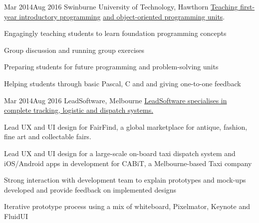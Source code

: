 {    
        {Mar 2014}{Aug 2016}
        {Swinburne University of Technology, Hawthorn}
        {\href{http://www.swinburne.edu.au/study/courses/units/Introduction-to-Programming-COS10009/local}{Teaching first-year introductory programming} \href{http://www.swinburne.edu.au/study/courses/units/Object-Oriented-Programming-COS70006/local}{and object-oriented programming units}.}
        {
          \item Engagingly teaching students to learn foundation programming concepts
          \item Group discussion and running group exercises
          \item Preparing students for future programming and problem-solving units
          \item Helping students through basic Pascal, C and \Csh\hspace{0.25ex}and giving one-to-one feedback
        }
        {Mar 2014}{Aug 2016}
        {LeadSoftware, Melbourne}
        {\href{http://www.leadsoftware.com.au/}{LeadSoftware specialises in complete tracking, logistic and dispatch systems.}}
        {
          \item Lead UX and UI design for FairFind, a global marketplace for antique, fashion, fine art and collectable fairs.
          \item Lead UX and UI design for a large-scale on-board taxi dispatch system and iOS/Android apps in development for CABiT, a Melbourne-based Taxi company
          \item Strong interaction with development team to explain prototypes and mock-ups developed and provide feedback on implemented designs
          \item Iterative prototype process using a mix of whiteboard, Pixelmator, Keynote and FluidUI
        }
}

